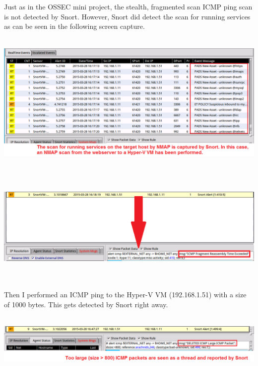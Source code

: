 \documentclass[11pt, a4paper]{article}
\begin{document}
$\;$ \\ \\
Just as in the OSSEC mini project, the stealth, fragmented scan ICMP ping scan is not detected by Snort. However, Snort did detect the scan for running services as can be seen in the following screen capture. \\ \\
\noindent\begin{minipage}{\textwidth}
    \centering
    \includegraphics[width=\textwidth]{Ping_Fragmented.png}
\end{minipage}
$\;$ \\ \\
\noindent\begin{minipage}{\textwidth}
    \centering
    \includegraphics[width=\textwidth]{Ping_Fragmented_2.png}
\end{minipage}
$\;$ \\ \\
Then I performed an ICMP ping to the Hyper-V VM (192.168.1.51) with a size of 1000 bytes. This gets detected by Snort right away. \\ \\
\noindent\begin{minipage}{\textwidth}
    \centering
    \includegraphics[width=\textwidth]{Ping_Large.png}
\end{minipage}
\end{document}
